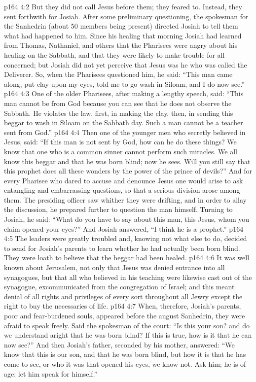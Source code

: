 \vs p164 4:2 But they did not call Jesus before them; they feared to. Instead, they sent forthwith for Josiah. After some preliminary questioning, the spokesman for the Sanhedrin (about 50 members being present) directed Josiah to tell them what had happened to him. Since his healing that morning Josiah had learned from Thomas, Nathaniel, and others that the Pharisees were angry about his healing on the Sabbath, and that they were likely to make trouble for all concerned; but Josiah did not yet perceive that Jesus was he who was called the Deliverer. So, when the Pharisees questioned him, he said: “This man came along, put clay upon my eyes, told me to go wash in Siloam, and I do now see.”
\vs p164 4:3 One of the older Pharisees, after making a lengthy speech, said: “This man cannot be from God because you can see that he does not observe the Sabbath. He violates the law, first, in making the clay, then, in sending this beggar to wash in Siloam on the Sabbath day. Such a man cannot be a teacher sent from God.”
\vs p164 4:4 Then one of the younger men who secretly believed in Jesus, said: “If this man is not sent by God, how can he do these things? We know that one who is a common sinner cannot perform such miracles. We all know this beggar and that he was born blind; now he sees. Will you still say that this prophet does all these wonders by the power of the prince of devils?” And for every Pharisee who dared to accuse and denounce Jesus one would arise to ask entangling and embarrassing questions, so that a serious division arose among them. The presiding officer saw whither they were drifting, and in order to allay the discussion, he prepared further to question the man himself. Turning to Josiah, he said: “What do you have to say about this man, this Jesus, whom you claim opened your eyes?” And Josiah answered, “I think he is a prophet.”
\vs p164 4:5 The leaders were greatly troubled and, knowing not what else to do, decided to send for Josiah’s parents to learn whether he had actually been born blind. They were loath to believe that the beggar had been healed.
\vs p164 4:6 It was well known about Jerusalem, not only that Jesus was denied entrance into all synagogues, but that all who believed in his teaching were likewise cast out of the synagogue, excommunicated from the congregation of Israel; and this meant denial of all rights and privileges of every sort throughout all Jewry except the right to buy the necessaries of life.
\vs p164 4:7 When, therefore, Josiah’s parents, poor and fear\hyp{}burdened souls, appeared before the august Sanhedrin, they were afraid to speak freely. Said the spokesman of the court: “Is this your son? and do we understand aright that he was born blind? If this is true, how is it that he can now see?” And then Josiah’s father, seconded by his mother, answered: “We know that this is our son, and that he was born blind, but how it is that he has come to see, or who it was that opened his eyes, we know not. Ask him; he is of age; let him speak for himself.”
